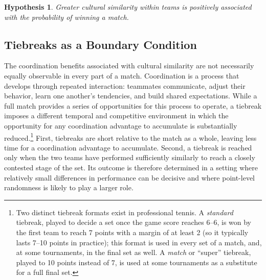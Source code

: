\documentclass[10pt]{article}
\newtheorem{hypothesis}{Hypothesis}
\begin{document}
\begin{hypothesis}
Greater cultural similarity within teams is positively associated with the probability of winning a match.
\end{hypothesis}
\subsection{Tiebreaks as a Boundary Condition}



The coordination benefits associated with cultural similarity are not necessarily  equally observable in every part of a match. Coordination is a process that develops through repeated interaction: teammates communicate, adjust their behavior, learn one another's tendencies, and build shared expectations. While a full match provides a series of opportunities for this process to operate, a tiebreak imposes a different temporal and competitive environment in which the opportunity for any coordination advantage to accumulate is substantially reduced.\footnote{Two distinct tiebreak formats exist in professional tennis. A \emph{standard} tiebreak, played to decide a set once the game score reaches 6--6, is won by the first team to reach 7 points with a margin of at least 2 (so it typically lasts 7--10 points in practice); this format is used in every set of a match, and, at some tournaments, in the final set as well. A \emph{match} or ``super'' tiebreak, played to 10 points instead of 7, is used at some tournaments as a substitute for a full final set. } First, tiebreaks are short relative to the match as a whole, leaving less time for a coordination advantage to accumulate. Second, a tiebreak is reached only when the two teams have performed sufficiently similarly to reach a closely contested stage of the set. Its outcome is therefore determined in a setting where relatively small differences in performance can be decisive and where point-level randomness is likely to play a larger role.
\end{document}
